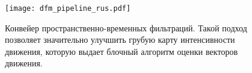 \begin{figure}[!h]
	\begin{minipage}[b]{1.0\linewidth}
		\centering
		\centerline{ \texttt{[image: dfm\_pipeline\_rus.pdf]} }
	\end{minipage}
    \caption{ Конвейер пространственно-временных фильтраций. Такой подход позволяет 
    	значительно улучшить грубую карту интенсивности движения, которую выдает блочный 
    	алгоритм оценки векторов движения.}
	\label{fig:dfm}
\end{figure}
